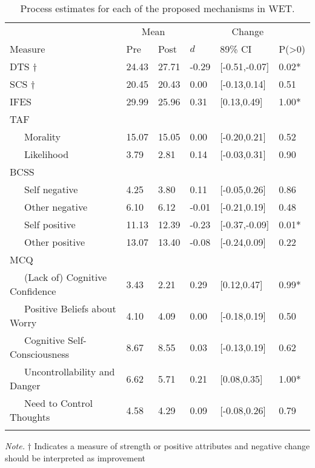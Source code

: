\documentclass[
  man,floatsintext]{apa7}
\begin{document}
\begin{table}[tbp]

\begin{center}
\begin{threeparttable}

\caption{\label{tab:processes_tab}Process estimates for each of the proposed mechanisms in WET.}

\begin{tabular}{llllll}
\toprule
 & \multicolumn{2}{c}{Mean} & \multicolumn{3}{c}{Change} \\
\cmidrule(r){2-3} \cmidrule(r){4-6}
Measure & Pre & Post & $d$ & 89\% CI & P(>0)\\
\midrule
DTS † & 24.43 & 27.71 & -0.29 & {}[-0.51,-0.07] & 0.02*\\
SCS † & 20.45 & 20.43 & 0.00 & {}[-0.13,0.14] & 0.51\\
IFES & 29.99 & 25.96 & 0.31 & {}[0.13,0.49] & 1.00*\\
TAF &  &  &  &  & \\
\ \ \ Morality & 15.07 & 15.05 & 0.00 & {}[-0.20,0.21] & 0.52\\
\ \ \ Likelihood & 3.79 & 2.81 & 0.14 & {}[-0.03,0.31] & 0.90\\
BCSS &  &  &  &  & \\
\ \ \ Self negative & 4.25 & 3.80 & 0.11 & {}[-0.05,0.26] & 0.86\\
\ \ \ Other negative & 6.10 & 6.12 & -0.01 & {}[-0.21,0.19] & 0.48\\
\ \ \ Self positive & 11.13 & 12.39 & -0.23 & {}[-0.37,-0.09] & 0.01*\\
\ \ \ Other positive & 13.07 & 13.40 & -0.08 & {}[-0.24,0.09] & 0.22\\
MCQ &  &  &  &  & \\
\ \ \ (Lack of) Cognitive Confidence & 3.43 & 2.21 & 0.29 & {}[0.12,0.47] & 0.99*\\
\ \ \ Positive Beliefs about Worry & 4.10 & 4.09 & 0.00 & {}[-0.18,0.19] & 0.50\\
\ \ \ Cognitive Self-Consciousness & 8.67 & 8.55 & 0.03 & {}[-0.13,0.19] & 0.62\\
\ \ \ Uncontrollability and Danger & 6.62 & 5.71 & 0.21 & {}[0.08,0.35] & 1.00*\\
\ \ \ Need to Control Thoughts & 4.58 & 4.29 & 0.09 & {}[-0.08,0.26] & 0.79\\
\bottomrule
\addlinespace
\end{tabular}

\begin{tablenotes}[para]
\normalsize{\textit{Note.}  † Indicates a measure of strength or positive attributes and negative change should be interpreted as improvement}
\end{tablenotes}

\end{threeparttable}
\end{center}

\end{table}
\end{document}
